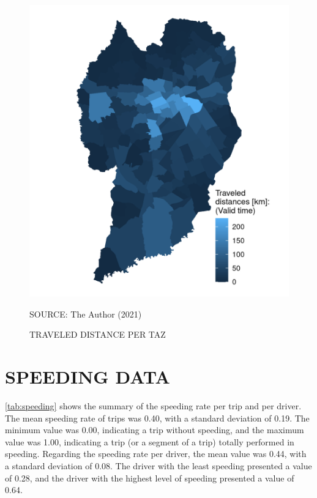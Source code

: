 \begin{figure}[!htbp]
    \centering\footnotesize
    \captionsetup{font=footnotesize}
    \caption{TRAVELED DISTANCE PER TAZ}
    \includegraphics{fig/map_dist.png}
    \label{fig:taz_travel}
    \par SOURCE: The Author (2021)
\end{figure}

\section{SPEEDING DATA} \label{sec:spr}


\autoref{tab:speeding} shows the summary of the speeding rate per trip and per driver. The mean speeding rate of trips was 0.40, with a standard deviation of 0.19. The minimum value was 0.00, indicating a trip without speeding, and the maximum value was 1.00, indicating a trip (or a segment of a trip) totally performed in speeding. Regarding the speeding rate per driver, the mean value was 0.44, with a standard deviation of 0.08. The driver with the least speeding presented a value of 0.28, and the driver with the highest level of speeding presented a value of 0.64.

